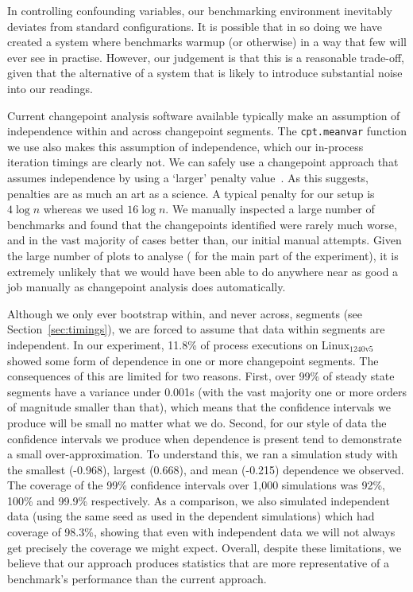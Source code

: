 \documentclass[acmsmall]{acmart}\settopmatter{printfolios=true}
\newcommand{\bencherseven}{Linux$_\mathrm{1240v5}$\xspace}
\begin{document}
In controlling confounding variables, our benchmarking environment inevitably
deviates from standard configurations. It is possible that in so doing we have
created a system where benchmarks warmup (or otherwise) in a way that few will ever see in
practise. However, our judgement is that this is a reasonable trade-off,
given that the alternative of a
system that is likely to introduce substantial noise into our readings.

Current changepoint analysis software available typically make an assumption of independence 
within and across changepoint segments.  The \texttt{cpt.meanvar} function we use also makes this 
assumption of independence, which our in-process iteration timings are clearly not.
We can safely use a changepoint approach that assumes independence by using a `larger'
penalty value~\cite{antoch97effect}. As this suggests, penalties are as much an
art as a science. A typical penalty for our setup is $4 \log n$ whereas we used $16 \log n$.
We manually inspected a large number of benchmarks and found that the
changepoints identified were rarely much worse, and in the vast majority of
cases better than, our initial manual attempts. Given the large number of
plots to analyse (\totalpexecs{} for the main part of the experiment), it is extremely unlikely that
we would have been able to do anywhere near as good a job manually as
changepoint analysis does automatically.

Although we only ever bootstrap within, and never across, segments (see
Section~\ref{sec:timings}), we are forced to assume that data within segments
are independent. In our experiment, 11.8\% of process executions on \bencherseven
showed some form of dependence in one or more changepoint segments.
The consequences of this are limited for two
reasons. First, over 99\% of steady state segments have a variance under 0.001s
(with the vast majority one or more orders of magnitude smaller than that),
which means that the confidence intervals we produce will be small no matter
what we do. Second, for our style of data the confidence intervals we
produce when dependence is present tend to demonstrate a small over-approximation.
To understand this, we ran a simulation study with the smallest (-0.968),
largest (0.668), and mean (-0.215) dependence we observed. The coverage
of the 99\% confidence intervals over 1,000 simulations was
92\%, 100\% and 99.9\% respectively. As a comparison, we also simulated independent data (using the
same seed as used in the dependent simulations) which had coverage of 98.3\%, showing
that even with independent data we will not always get precisely the coverage we might expect.
Overall, despite these limitations, we believe that our
approach produces statistics that are more representative of
a benchmark's performance than the current approach.
\end{document}
